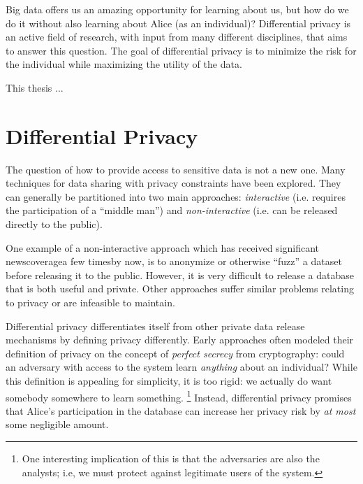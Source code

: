 \documentclass[12pt]{report}
\begin{document}
Big data offers us an amazing opportunity for learning about us, but how do we do it without also learning about Alice (as an individual)?
Differential privacy is an active field of research, with input from many different disciplines, that aims to answer this question\cite{journals/cacm/Dwork11}.
The goal of differential privacy is to minimize the risk for the individual while maximizing the utility of the data.

This thesis ...

\section{Differential Privacy}\label{sec:intro-diffpriv}

The question of how to provide access to sensitive data is not a new one.
Many techniques for data sharing with privacy constraints have been explored.
They can generally be partitioned into two main approaches: \textit{interactive} (i.e. requires the participation of a ``middle man'') and \textit{non-interactive} (i.e. can be released directly to the public).

One example of a non-interactive approach which has received significant news\footnotemark[\ref{fn:aol}] coverage\footnotemark[\ref{fn:twitter}] a few times\footnotemark[\ref{fn:netflix}] by now\footnotemark[\ref{fn:gic}], is to anonymize or otherwise ``fuzz'' a dataset before releasing it to the public.
However, it is very difficult to release a database that is both useful and private.
Other approaches suffer similar problems relating to privacy or are infeasible to maintain\cite{journals/cacm/Dwork11}.

Differential privacy differentiates itself from other private data release mechanisms by defining privacy differently.
Early approaches often modeled their definition of privacy on the concept of \textit{perfect secrecy} from cryptography: could an adversary with access to the system learn \textit{anything} about an individual?
While this definition is appealing for simplicity, it is too rigid: we actually do want somebody somewhere to learn something.
\footnote{One interesting implication of this is that the adversaries are also the analysts; i.e, we must protect against legitimate users of the system.}
Instead, differential privacy promises that Alice's participation in the database can increase her privacy risk by \textit{at most} some negligible amount.
\end{document}
